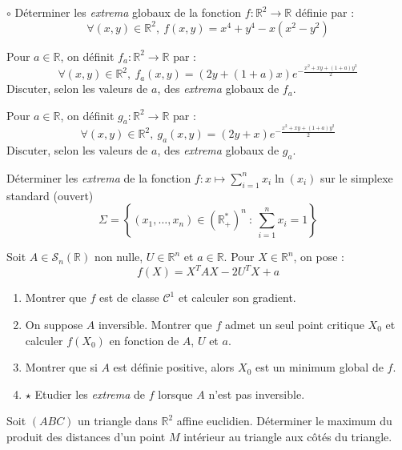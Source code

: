 \documentclass[french,a4paper]{article}
\newcommand{\R}{\mathbb{R}}
\newcommand{\st}{^*}
\theoremstyle{plain}
\theoremstyle{definition}
\theoremstyle{remark}
\begin{document}
\begin{ex}[Moulin.CD.36]{$\circ$}
	Déterminer les \textit{extrema} globaux de la fonction $f:\R^2\to\R$ définie par : $$\forall (x,y)\in\R^2,\ f(x,y)=x^4+y^4-x(x^2-y^2)$$
\end{ex}

\begin{ex}[Moulin.CD.37]{}
	Pour $a\in\R$, on définit $f_a:\R^2\to\R$ par : $$\forall (x,y)\in\R^2,\ f_a(x,y)=(2y+(1+a)x)e^{\displaystyle-\frac{x^2+xy+(1+a)y^2}{2}}$$ Discuter, selon les valeurs de $a$, des \textit{extrema} globaux de $f_a$.
\end{ex}

\begin{ex}[Moulin.CD.38]{}
	Pour $a\in\R$, on définit $g_a:\R^2\to\R$ par : $$\forall (x,y)\in\R^2,\ g_a(x,y)=(2y+x)e^{\displaystyle-\frac{x^2+xy+(1+a)y^2}{2}}$$ Discuter, selon les valeurs de $a$, des \textit{extrema} globaux de $g_a$.
\end{ex}

\begin{ex}[Moulin.CD.39]{}
	Déterminer les \textit{extrema} de la fonction $f:x\mapsto\displaystyle\sum_{i=1}^{n}x_i\ln(x_i)$ sur le simplexe standard (ouvert) $$\Sigma=\left\{(x_1,\ldots,x_n)\in(\R_+\st)^n\ : \ \sum_{i=1}^{n}x_i=1\right\}$$
\end{ex}

\begin{ex}[Moulin.CD.40]{}
	Soit $A\in\mathcal{S}_n(\R)$ non nulle, $U\in\R^n$ et $a\in\R$. Pour $X\in\R^n$, on pose : $$f(X)=X^TAX-2U^TX+a$$
	\begin{enumerate}
		\item Montrer que $f$ est de classe $\mathcal{C}^1$ et calculer son gradient.
		\item On suppose $A$ inversible. Montrer que $f$ admet un seul point critique $X_0$ et calculer $f(X_0)$ en fonction de $A$, $U$ et $a$.
		\item Montrer que si $A$ est définie positive, alors $X_0$ est un minimum global de $f$.
		\item $\star$ Etudier les \textit{extrema} de $f$ lorsque $A$ n'est pas inversible.
	\end{enumerate}
\end{ex}

\begin{ex}[Moulin.CD.41]{}
	Soit $(ABC)$ un triangle dans $\R^2$ affine euclidien. Déterminer le maximum du produit des distances d'un point $M$ intérieur au triangle aux côtés du triangle.
\end{ex}
\end{document}
